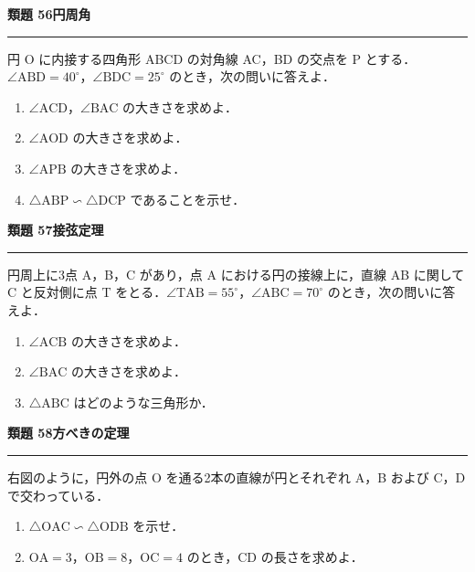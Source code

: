 \documentclass[a4paper,11pt]{ltjsarticle}
\newcommand{\mon}[2]{\Needspace{7\baselineskip}\vspace{10pt}%
  {\sffamily\bfseries 類題 #1\quad #2\par}\vspace{2pt}\hrule\vspace{4pt}}
\begin{document}
\mon{56}{円周角}
円 O に内接する四角形 ABCD の対角線 AC，BD の交点を P とする．$\angle\mathrm{ABD}=40^\circ$，$\angle\mathrm{BDC}=25^\circ$ のとき，次の問いに答えよ．
\begin{enumerate}
\item $\angle\mathrm{ACD}$，$\angle\mathrm{BAC}$ の大きさを求めよ．
\item $\angle\mathrm{AOD}$ の大きさを求めよ．
\item $\angle\mathrm{APB}$ の大きさを求めよ．
\item $\triangle\mathrm{ABP}\backsim\triangle\mathrm{DCP}$ であることを示せ．
\end{enumerate}

\mon{57}{接弦定理}
円周上に3点 A，B，C があり，点 A における円の接線上に，直線 AB に関して C と反対側に点 T をとる．$\angle\mathrm{TAB}=55^\circ$，$\angle\mathrm{ABC}=70^\circ$ のとき，次の問いに答えよ．
\begin{enumerate}
\item $\angle\mathrm{ACB}$ の大きさを求めよ．
\item $\angle\mathrm{BAC}$ の大きさを求めよ．
\item $\triangle\mathrm{ABC}$ はどのような三角形か．
\end{enumerate}

\mon{58}{方べきの定理}
\begin{minipage}[t]{0.6\linewidth}
右図のように，円外の点 O を通る2本の直線が円とそれぞれ A，B および C，D で交わっている．
\begin{enumerate}
\item $\triangle\mathrm{OAC}\backsim\triangle\mathrm{ODB}$ を示せ．
\item $\mathrm{OA}=3$，$\mathrm{OB}=8$，$\mathrm{OC}=4$ のとき，CD の長さを求めよ．
\end{enumerate}
\end{minipage}\hfill
\begin{minipage}[t]{0.37\linewidth}
\vspace{-4pt}
\end{minipage}
\end{document}
